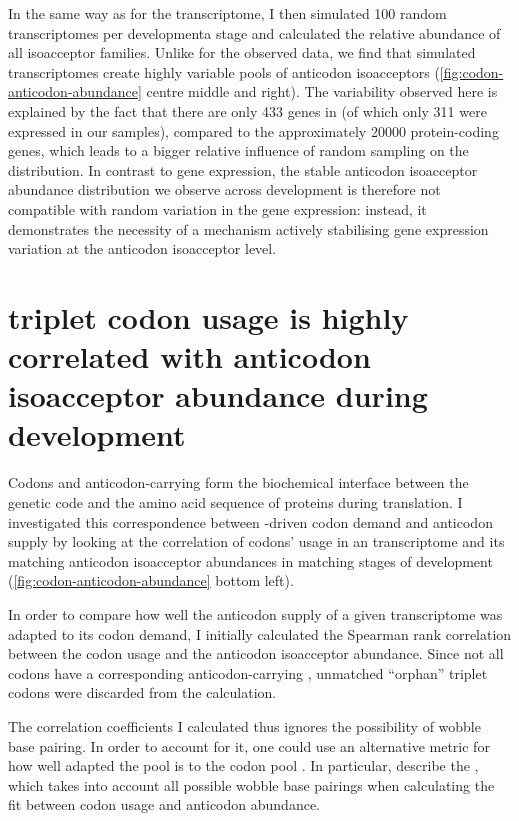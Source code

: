 In the same way as for the \mrna transcriptome, I then simulated \num{100}
random \trna transcriptomes per developmenta stage and calculated the relative
abundance of all isoacceptor families. Unlike for the observed \trna data, we
find that simulated \trna transcriptomes create highly variable pools of
anticodon isoacceptors (\cref{fig:codon-anticodon-abundance} centre middle and
right). The variability observed here is explained by the fact that there are
only \num{433} \trna genes in \mmu (of which only \num{311} were expressed in
our samples), compared to the approximately \num{20000} protein-coding genes,
which leads to a bigger relative influence of random sampling on the
distribution. In contrast to \mrna gene expression, the stable anticodon
isoacceptor abundance distribution we observe across development is therefore
not compatible with random variation in the \trna gene expression: instead, it
demonstrates the necessity of a mechanism actively stabilising \trna gene
expression variation at the anticodon isoacceptor level.

\section{\mrna triplet codon usage is highly correlated with \trna anticodon
isoacceptor abundance during development}

Codons and anticodon-carrying \trna[s] form the biochemical interface between
the genetic code and the amino acid sequence of proteins during \mrna
translation. I investigated this correspondence between \mrna-driven codon
demand and \trna anticodon supply by looking at the correlation of codons’ usage
in an \mrna transcriptome and its matching \trna anticodon isoacceptor
abundances in matching stages of development
(\cref{fig:codon-anticodon-abundance} bottom left).

In order to compare how well the anticodon supply of a given transcriptome was
adapted to its codon demand, I initially calculated the Spearman rank
correlation between the codon usage and the anticodon isoacceptor abundance.
Since not all codons have a corresponding anticodon-carrying \trna, unmatched
“orphan” triplet codons were discarded from the calculation.

The correlation coefficients I calculated thus ignores the possibility of
wobble base pairing. In order to account for it, one could use an alternative
metric for how well adapted the \trna pool is to the codon pool
\citep{Gingold:2011}. In particular, \citet{Dos_Reis:2004} describe the \tai,
which takes into account all possible wobble base pairings when calculating the
fit between codon usage and anticodon abundance.

